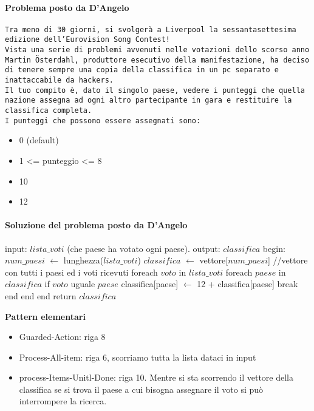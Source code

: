 \documentclass[a4paper]{article}
\begin{document}
\paragraph{Problema posto da D'Angelo}
\texttt{Tra meno di 30 giorni, si svolgerà a Liverpool la sessantasettesima edizione dell’Eurovision Song Contest!\\Vista una serie di problemi avvenuti nelle votazioni dello scorso anno Martin Österdahl, produttore esecutivo della manifestazione, ha deciso di tenere sempre una copia della classifica in un pc separato e inattaccabile da hackers.\\Il tuo compito è, dato il singolo paese, vedere i punteggi che quella nazione assegna ad ogni altro partecipante in gara e restituire la classifica completa.\\I punteggi che possono essere assegnati sono:}
\begin{itemize}
\item 0 (default)
\item 1 <= punteggio <= 8
\item 10
\item 12
\end{itemize}

\paragraph{Soluzione del problema posto da D'Angelo}

\begin{algorithm}[caption={Calcolo punteggi}, label={alg2}]
	input: $lista\_voti$ (che paese ha votato ogni paese).
	output: $classifica$
	begin:
	$num\_paesi$ $\gets$ lunghezza($lista\_voti$)
	$classifica$ $\gets$ vettore[$num\_paesi$] //vettore con tutti i paesi ed i voti ricevuti
	foreach $voto$ in $lista\_voti$
		foreach $paese$ in $classifica$
			if $voto$ uguale $paese$
				classifica[paese] $\gets$ 12 + classifica[paese]
				break
			end
		end
	end
	return $classifica$
\end{algorithm}

\textbf{Pattern elementari}
\begin{itemize}
	\item Guarded-Action: riga 8
	\item Process-All-item: riga 6, scorriamo tutta la lista dataci in input
	\item process-Items-Unitl-Done: riga 10. Mentre si sta scorrendo il vettore della classifica se si trova il paese a cui bisogna assegnare il voto si può interrompere la ricerca.
\end{itemize}
\end{document}

